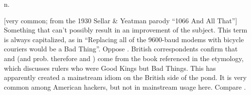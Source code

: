  n.

[very common; from the 1930 Sellar \& Yeatman parody ``1066 And All That'']
Something that can't possibly result in an improvement of the subject. This term
is always capitalized, as in ``Replacing all of the 9600-baud modems with
bicycle couriers would be a Bad Thing''. Oppose . British
correspondents confirm that  and 
(and prob. therefore  and ) come
from the book referenced in the etymology, which discusses rulers who were Good
Kings but Bad Things. This has apparently created a mainstream idiom on the
British side of the pond. It is very common among American hackers, but not in
mainstream usage here. Compare .

